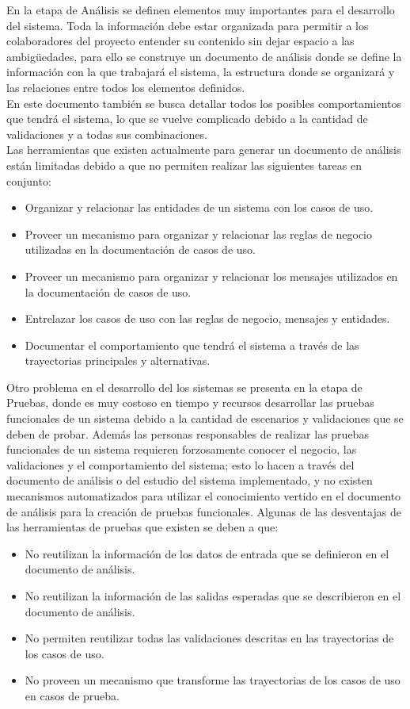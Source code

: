 En la etapa de Análisis se definen elementos muy importantes para el desarrollo del sistema. Toda la información debe estar organizada para permitir
a los colaboradores del proyecto entender su contenido sin dejar espacio a las ambigüedades, para ello se construye un documento de análisis donde se define la información 
con la que trabajará el sistema, la estructura donde se organizará y las relaciones entre todos los elementos definidos.\\

En este documento también se busca detallar todos los posibles comportamientos que tendrá el sistema, lo que se vuelve complicado debido a 
la cantidad de validaciones y a todas sus combinaciones.\\

Las herramientas que existen actualmente para generar un documento de análisis están limitadas debido a que no permiten realizar las siguientes tareas en conjunto:
\begin{itemize}
 \item Organizar y relacionar las entidades de un sistema con los casos de uso.
 \item Proveer un mecanismo para organizar y relacionar las reglas de negocio utilizadas en la documentación de casos de uso.
 \item Proveer un mecanismo para organizar y relacionar los mensajes utilizados en la documentación de casos de uso.
 \item Entrelazar los casos de uso con las reglas de negocio, mensajes y entidades. 
 \item Documentar el comportamiento que tendrá el sistema a través de las trayectorias principales y alternativas.
\end{itemize}

Otro problema en el desarrollo del los sistemas se presenta en la etapa de Pruebas, donde es muy costoso en tiempo y recursos desarrollar las pruebas funcionales
de un sistema debido a la cantidad de escenarios y validaciones que se deben de probar. Además las personas responsables de realizar las pruebas funcionales 
de un sistema requieren forzosamente conocer el negocio, las validaciones y el comportamiento del sistema; esto lo hacen a través del documento de análisis o del estudio del 
sistema implementado, y no existen mecanismos automatizados para utilizar el conocimiento vertido en el documento de análisis para la creación de pruebas
funcionales. Algunas de las desventajas de las herramientas de pruebas que existen se deben a que:

\begin{itemize}
 \item No reutilizan la información de los datos de entrada que se definieron en el documento de análisis.
 \item No reutilizan la información de las salidas esperadas que se describieron en el documento de análisis.
 \item No permiten reutilizar todas las validaciones descritas en las trayectorias de los casos de uso.
 \item No proveen un mecanismo que transforme las trayectorias de los casos de uso en casos de prueba.
\end{itemize}